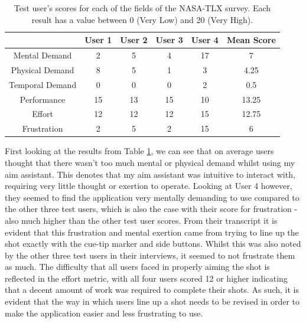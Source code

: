 \documentclass[ %
                author={Finn Alexander Wilkinson},
                supervisor={Dr. Andrew Calway},
                degree={MEng},
                title={\centering A Mixed Reality Aim Assistant for Pool and Snooker},
                subtitle={},
                type={Enterprise},
                year={2021} ]{dissertation}
\begin{document}
\begin{table}[ht!]
    \centering
    \begin{tabular}{|c|c|c|c|c||c|}
        \hline
        & User 1 & User 2 & User 3 & User 4 & Mean Score \\
        \hline
        Mental Demand & 2 & 5 & 4 & 17 & 7\\
        \hline
        Physical Demand & 8 & 5 & 1 & 3 & 4.25\\
        \hline
        Temporal Demand & 0 & 0 & 0 & 2 & 0.5\\
        \hline
        Performance & 15 & 13 & 15 & 10 & 13.25\\
        \hline
        Effort & 12 & 12 & 12 & 15 & 12.75\\
        \hline
        Frustration & 2 & 5 & 2 & 15 & 6\\
        \hline
    \end{tabular}
    \caption{Test user's scores for each of the fields of the NASA-TLX survey. Each result has a value between 0 (Very Low) and 20 (Very High).}
    \label{tab:NASA-TLX_results}
\end{table}

First looking at the results from Table \ref{tab:NASA-TLX_results}, we can see that on average users thought that there wasn't too much mental or physical demand whilst using my aim assistant. This denotes that my aim assistant was intuitive to interact with, requiring very little thought or exertion to operate. Looking at User 4 however, they seemed to find the application very mentally demanding to use compared to the other three test users, which is also the case with their score for frustration - also much higher than the other test user scores. From their transcript it is evident that this frustration and mental exertion came from trying to line up the shot exactly with the cue-tip marker and side buttons. Whilst this was also noted by the other three test users in their interviews, it seemed to not frustrate them as much. The difficulty that all users faced in properly aiming the shot is reflected in the effort metric, with all four users scored 12 or higher indicating that a decent amount of work was required to complete their shots. As such, it is evident that the way in which users line up a shot needs to be revised in order to make the application easier and less frustrating to use. \\
\end{document}
